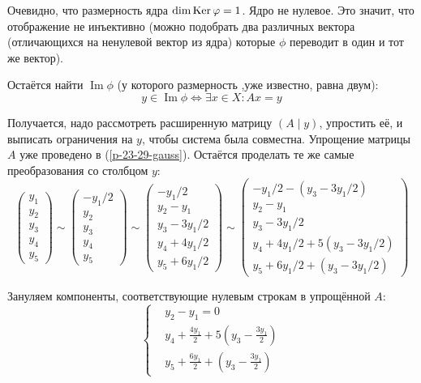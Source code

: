 \documentclass[a4paper,12pt]{article}
\DeclareMathOperator{\Image}{Im}
\begin{document}
\begin{solution}
    Очевидно, что размерность ядра $\dim\Ker\phi \hm= 1$.
    Ядро не нулевое.
    Это значит, что отображение не инъективно (можно подобрать два различных вектора (отличающихся на ненулевой вектор из ядра) которые $\phi$ переводит в один и тот же вектор).
    
    Остаётся найти $\Image\phi$ (у которого размерность ,уже известно, равна двум):
    \[
      y \in \Image\phi \Leftrightarrow \exists x \in X: Ax = y
    \]
    
    Получается, надо рассмотреть расширенную матрицу $(A \mid y)$, упростить её, и выписать ограничения на $y$, чтобы система была совместна.
    Упрощение матрицы $A$ уже проведено в (\ref{p-23-29-gauss}).
    Остаётся проделать те же самые преобразования со столбцом $y$:
    \[
      \begin{pmatrix}
        y_1 \\ y_2 \\ y_3 \\ y_4 \\ y_5
      \end{pmatrix}
      \sim \begin{pmatrix}
        -y_1/2 \\ y_2 \\ y_3 \\ y_4 \\ y_5
      \end{pmatrix}
      \sim \begin{pmatrix}
        -y_1/2 \\ y_2 - y_1 \\ y_3 - 3y_1/2 \\ y_4 + 4y_1/2 \\ y_5 + 6y_1/2
      \end{pmatrix}
      \sim \begin{pmatrix}
        -y_1/2 - \left(y_3 - 3y_1/2\right) \\ y_2 - y_1 \\ y_3 - 3y_1/2 \\ y_4 + 4y_1/2 + 5 \left(y_3 - 3y_1/2\right) \\ y_5 + 6y_1/2 + \left(y_3 - 3y_1/2\right)
      \end{pmatrix}
    \]
    
    Зануляем компоненты, соответствующие нулевым строкам в упрощённой $A$:
    \[
      \left\{
        \begin{aligned}
          &y_2 - y_1 = 0\\
          &y_4 + \frac{4y_1}{2} + 5 \left(y_3 - \frac{3y_1}{2}\right)\\
          &y_5 + \frac{6y_1}{2} + \left(y_3 - \frac{3y_1}{2}\right)
        \end{aligned}
      \right.
    \]
    

\end{solution}
\end{document}
